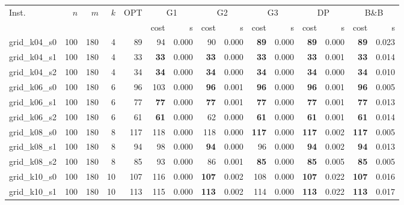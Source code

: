 \begin{longtable}{@{}lrrrr@{\hspace{9pt}}rr@{\hspace{9pt}}rr@{\hspace{9pt}}rr@{\hspace{9pt}}rr@{\hspace{9pt}}rr@{}}\toprule
Inst. & \(n\) & \(m\) & \(k\) & OPT & \multicolumn{2}{c}{G1} & \multicolumn{2}{c}{G2} & \multicolumn{2}{c}{G3} & \multicolumn{2}{c}{DP} & \multicolumn{2}{c}{B\&B}\\
\cmidrule(l{6pt}){6-7}\cmidrule(l{6pt}){8-9}\cmidrule(l{6pt}){10-11}\cmidrule(l{6pt}){12-13}\cmidrule(l{6pt}){14-15}
 & & & & & cost & s & cost & s & cost & s & cost & s & cost & s\\\midrule\endhead
grid\_k04\_s0 & 100 & 180 & 4 & 89 & 94 & 0.000 & 90 & 0.000 & \textbf{89} & 0.000 & \textbf{89} & 0.000 & \textbf{89} & 0.023\\
grid\_k04\_s1 & 100 & 180 & 4 & 33 & \textbf{33} & 0.000 & \textbf{33} & 0.000 & \textbf{33} & 0.000 & \textbf{33} & 0.001 & \textbf{33} & 0.014\\
grid\_k04\_s2 & 100 & 180 & 4 & 34 & \textbf{34} & 0.000 & \textbf{34} & 0.000 & \textbf{34} & 0.000 & \textbf{34} & 0.000 & \textbf{34} & 0.010\\
grid\_k06\_s0 & 100 & 180 & 6 & 96 & 103 & 0.000 & \textbf{96} & 0.001 & \textbf{96} & 0.000 & \textbf{96} & 0.001 & \textbf{96} & 0.005\\
grid\_k06\_s1 & 100 & 180 & 6 & 77 & \textbf{77} & 0.000 & \textbf{77} & 0.001 & \textbf{77} & 0.000 & \textbf{77} & 0.001 & \textbf{77} & 0.013\\
grid\_k06\_s2 & 100 & 180 & 6 & 61 & \textbf{61} & 0.000 & 62 & 0.000 & \textbf{61} & 0.000 & \textbf{61} & 0.001 & \textbf{61} & 0.014\\
grid\_k08\_s0 & 100 & 180 & 8 & 117 & 118 & 0.000 & 118 & 0.000 & \textbf{117} & 0.000 & \textbf{117} & 0.002 & \textbf{117} & 0.005\\
grid\_k08\_s1 & 100 & 180 & 8 & 94 & 98 & 0.000 & \textbf{94} & 0.000 & 96 & 0.000 & \textbf{94} & 0.002 & \textbf{94} & 0.013\\
grid\_k08\_s2 & 100 & 180 & 8 & 85 & 93 & 0.000 & 86 & 0.001 & \textbf{85} & 0.000 & \textbf{85} & 0.005 & \textbf{85} & 0.005\\
grid\_k10\_s0 & 100 & 180 & 10 & 107 & 116 & 0.000 & \textbf{107} & 0.002 & 108 & 0.000 & \textbf{107} & 0.022 & \textbf{107} & 0.016\\
grid\_k10\_s1 & 100 & 180 & 10 & 113 & 115 & 0.000 & \textbf{113} & 0.002 & 114 & 0.000 & \textbf{113} & 0.022 & \textbf{113} & 0.017\\

\end{longtable}

